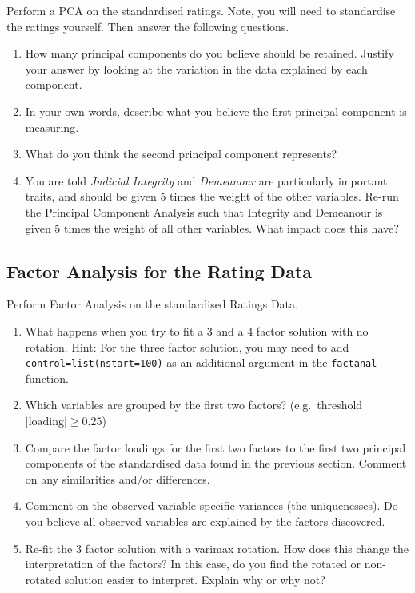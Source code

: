 \documentclass[
]{article}
\begin{document}
Perform a PCA on the standardised ratings. Note, you will need to
standardise the ratings yourself. Then answer the following questions.

\begin{enumerate}
\def\labelenumi{\arabic{enumi}.}
\item
  How many principal components do you believe should be retained.
  Justify your answer by looking at the variation in the data explained
  by each component.
\item
  In your own words, describe what you believe the first principal
  component is measuring.
\item
  What do you think the second principal component represents?
\item
  You are told \emph{Judicial Integrity} and \emph{Demeanour} are
  particularly important traits, and should be given 5 times the weight
  of the other variables. Re-run the Principal Component Analysis such
  that Integrity and Demeanour is given 5 times the weight of all other
  variables. What impact does this have?
\end{enumerate}

\hypertarget{factor-analysis-for-the-rating-data}{%
\subsection{Factor Analysis for the Rating
Data}\label{factor-analysis-for-the-rating-data}}

Perform Factor Analysis on the standardised Ratings Data.

\begin{enumerate}
\def\labelenumi{\arabic{enumi}.}
\item
  What happens when you try to fit a 3 and a 4 factor solution with no
  rotation. Hint: For the three factor solution, you may need to add
  \texttt{control=list(nstart=100)} as an additional argument in the
  \texttt{factanal} function.
\item
  Which variables are grouped by the first two factors? (e.g.~threshold
  \(|\text{loading}| \geq 0.25\))
\item
  Compare the factor loadings for the first two factors to the first two
  principal components of the standardised data found in the previous
  section. Comment on any similarities and/or differences.
\item
  Comment on the observed variable specific variances (the
  uniquenesses). Do you believe all observed variables are explained by
  the factors discovered.
\item
  Re-fit the 3 factor solution with a varimax rotation. How does this
  change the interpretation of the factors? In this case, do you find
  the rotated or non-rotated solution easier to interpret. Explain why
  or why not?
\end{enumerate}
\end{document}
